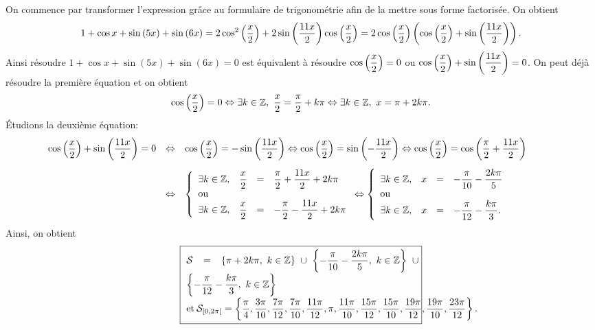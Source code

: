 \documentclass[a4paper, 11pt]{article}
\begin{document}
\begin{correction}
\begin{enumerate}
\noindent On commence par transformer l'expression gr\^{a}ce au formulaire de trigonom\'etrie afin de la mettre sous forme factoris\'ee. On obtient
$$ 1+\cos{x}+\sin{(5x)}+\sin{(6x)}=2\cos^2{\left(  \displaystyle\frac{x}{2}\right)}+2\sin{\left(  \displaystyle\frac{11x}{2}\right)}\cos{\left(  \displaystyle\frac{x}{2}\right)}=2\cos{\left(  \displaystyle\frac{x}{2}\right)} \left(  \cos{\left(  \displaystyle\frac{x}{2}\right)}  +\sin{\left(  \displaystyle\frac{11x}{2}\right)} \right).$$
Ainsi r\'esoudre $1+\cos{x}+\sin{(5x)}+\sin{(6x)}=0$ est \'equivalent \`{a} r\'esoudre $\cos{\left(  \displaystyle\frac{x}{2}\right)}=0$ ou $\cos{\left(  \displaystyle\frac{x}{2}\right)}  +\sin{\left(  \displaystyle\frac{11x}{2}\right)} =0$. On peut d\'ej\`{a} r\'esoudre la premi\`{e}re \'equation et on obtient
$$ \cos{\left(  \displaystyle\frac{x}{2}\right)}=0 \Leftrightarrow\exists k\in\mathbb{Z},\  \displaystyle\frac{x}{2}=\displaystyle\frac{\pi}{2}+k\pi\Leftrightarrow\exists k\in\mathbb{Z},\  x=\pi+2k\pi.$$
\'Etudions la deuxi\`{e}me \'equation:
$$\hspace{-1cm} \begin{array}{lll}\cos{\left(  \ddp\frac{x}{2}\right)}  +\sin{\left(  \ddp\frac{11x}{2}\right)} =0 &\Leftrightarrow &\cos{\left(  \ddp\frac{x}{2}\right)} =-\sin{\left(  \ddp\frac{11x}{2}\right)} \Leftrightarrow \cos{\left(  \ddp\frac{x}{2}\right)} =\sin{\left( - \ddp\frac{11x}{2}\right)} \Leftrightarrow
\cos{\left(  \ddp\frac{x}{2}\right)} =\cos{\left(\ddp\frac{\pi}{2} + \ddp\frac{11x}{2}\right)}\vsec\\ &\Leftrightarrow&
\left\lbrace\begin{array}{lllll}
\exists k\in\Z, & \ddp\frac{x}{2}&=& \ddp\frac{\pi}{2} + \ddp\frac{11x}{2}+2k\pi\\
\hbox{ou}\\
\exists k\in\Z, & \ddp\frac{x}{2}&=& -\ddp\frac{\pi}{2} - \ddp\frac{11x}{2}+2k\pi
\end{array}\right. \Leftrightarrow \left\lbrace\begin{array}{lllll}
\exists k\in\Z, & x&=& -\ddp\frac{\pi}{10} - \ddp\frac{2k\pi}{5}\\
\hbox{ou}\\
\exists k\in\Z, & x&=& -\ddp\frac{\pi}{12} - \ddp\frac{k\pi}{3}.
\end{array}\right. \end{array}$$
Ainsi, on obtient 
\begin{equation*}
 \fbox{
 \begin{minipage}[t]{0.7\textwidth}
$\mathcal{S}=\left\lbrace  \pi+2k\pi,\ k\in\Z\right\rbrace\cup\left\lbrace   -\ddp\frac{\pi}{10} - \ddp\frac{2k\pi}{5}, \ k\in\Z\right\rbrace\cup\left\lbrace -\ddp\frac{\pi}{12} - \ddp\frac{k\pi}{3},\ k\in\Z\right\rbrace\\ \hbox{et}\  \mathcal{S}_{\lbrack 0,2\pi\lbrack}= \left\lbrace \ddp\frac{\pi}{4},\ddp\frac{3\pi}{10},\ddp\frac{7\pi}{12},\ddp\frac{7\pi}{10},\ddp\frac{11\pi}{12},\pi,\ddp\frac{11\pi}{10},\ddp\frac{15\pi}{12},\ddp\frac{15\pi}{10},\ddp\frac{19\pi}{12},\ddp\frac{19\pi}{10},\ddp\frac{23\pi}{12}            \right\rbrace.$

\end{minipage}}
\end{equation*}
\end{enumerate}
\end{correction}
\end{document}
